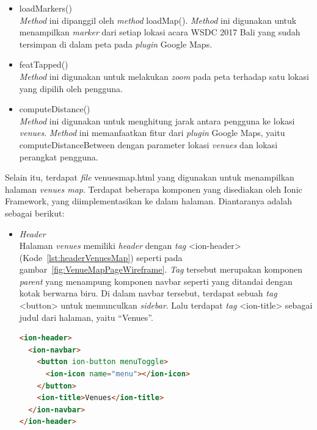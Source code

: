 \begin{itemize}
\begin{itemize}
		\item loadMarkers() \\
		\textit{Method} ini dipanggil oleh \textit{method} loadMap(). \textit{Method} ini digunakan untuk menampilkan \textit{marker} dari setiap lokasi acara WSDC 2017 Bali yang sudah tersimpan di dalam peta pada \textit{plugin} Google Maps.  
		
		\item featTapped() \\
		\textit{Method} ini digunakan untuk melakukan \textit{zoom} pada peta terhadap satu lokasi yang dipilih oleh pengguna. 
		
		\item computeDistance()\\
		\textit{Method} ini digunakan untuk menghitung jarak antara pengguna ke lokasi \textit{venues}. \textit{Method} ini memanfaatkan fitur dari \textit{plugin} Google Maps, yaitu computeDistanceBetween dengan parameter lokasi \textit{venues} dan lokasi perangkat pengguna.
	\end{itemize}
	
	Selain itu, terdapat \textit{file} venues\textunderscore map.html yang digunakan untuk menampilkan halaman \textit{venues map}. Terdapat beberapa komponen yang disediakan oleh Ionic Framework, yang diimplementasikan ke dalam halaman. Diantaranya adalah sebagai berikut:
	
	\begin{itemize}
		\item \textit{Header} \\
		 Halaman \textit{venues} memiliki \textit{header} dengan \textit{tag} <ion-header> (Kode~\ref{lst:headerVenuesMap}) seperti pada gambar~\ref{fig:VenueMapPageWireframe}. \textit{Tag} tersebut merupakan komponen \textit{parent} yang menampung komponen navbar seperti yang ditandai dengan kotak berwarna biru. Di dalam navbar tersebut, terdapat sebuah \textit{tag} <button> untuk memunculkan \textit{sidebar}. Lalu terdapat \textit{tag} <ion-title> sebagai judul dari halaman, yaitu ``Venues''.
		
\begin{lstlisting}[language=html, label={lst:headerVenuesMap}, caption=\textit{Header} pada venues\textunderscore map.html]
<ion-header>
  <ion-navbar>
    <button ion-button menuToggle>
      <ion-icon name="menu"></ion-icon>
    </button>
    <ion-title>Venues</ion-title>
  </ion-navbar>
</ion-header>
\end{lstlisting}


\end{itemize}
\end{itemize}
